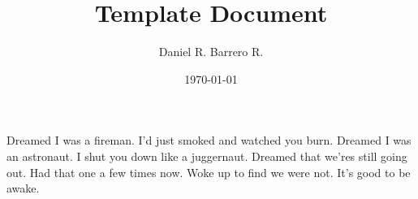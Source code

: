\documentclass{amsart}
\title{Template Document}
\author{Daniel R. Barrero R.}
\date{\today}
\begin{document}
\maketitle

\section{}

Dreamed I was a fireman. I'd just smoked and watched you burn. Dreamed I was an astronaut. I shut
you down like a juggernaut.
Dreamed that we'res still going out. Had that one a few times now.
Woke up to find we were not. It's good to be awake.
\end{document}
